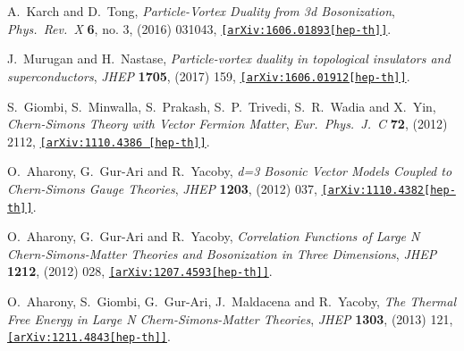 \begin{thebibliography}{99}
  A.~Karch and D.~Tong,
 {\it Particle-Vortex Duality from 3d Bosonization},
 {\it Phys.\ Rev.\ X} {\bf 6}, no. 3, (2016) 031043, 
  \href{https://arxiv.org/abs/1606.01893}{\tt[arXiv:1606.01893[hep-th]]}.
  
  J.~Murugan and H.~Nastase,
  {\it Particle-vortex duality in topological insulators and superconductors},
  {\it JHEP} {\bf 1705},  (2017) 159,
  \href{https://arxiv.org/abs/1606.01912}{\tt[arXiv:1606.01912[hep-th]]}.

  S.~Giombi, S.~Minwalla, S.~Prakash, S.~P.~Trivedi, S.~R.~Wadia and X.~Yin,
  {\it Chern-Simons Theory with Vector Fermion Matter},
  {\it Eur.\ Phys.\ J.\ C} {\bf 72}, (2012) 2112,
  \href{https://arxiv.org/abs/1110.4386} {\tt[arXiv:1110.4386 [hep-th]]}.
  
   
  O.~Aharony, G.~Gur-Ari and R.~Yacoby,
  {\it d=3 Bosonic Vector Models Coupled to Chern-Simons Gauge Theories},
  {\it JHEP} {\bf 1203}, (2012) 037, 
  \href{https://arxiv.org/abs/1110.4382}{\tt[arXiv:1110.4382[hep-th]]}.
  
  
  O.~Aharony, G.~Gur-Ari and R.~Yacoby,
 {\it Correlation Functions of Large N Chern-Simons-Matter Theories and Bosonization in Three Dimensions},
 {\it JHEP} {\bf 1212},  (2012) 028,
  \href{https://arxiv.org/abs/1207.4593}
  {\tt[arXiv:1207.4593[hep-th]]}.


  O.~Aharony, S.~Giombi, G.~Gur-Ari, J.~Maldacena and R.~Yacoby,
  {\it The Thermal Free Energy in Large N Chern-Simons-Matter Theories},
  {\it JHEP} {\bf 1303}, (2013) 121, 
  \href{https://arxiv.org/abs/1211.4843}{\tt[arXiv:1211.4843[hep-th]]}.


\end{thebibliography}
